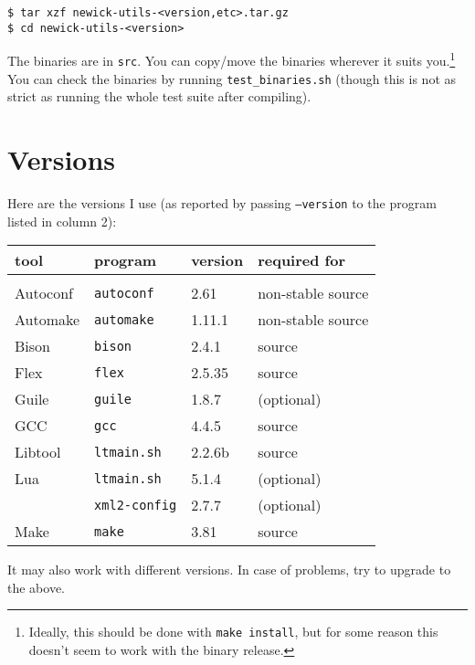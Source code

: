 \begin{verbatim}
$ tar xzf newick-utils-<version,etc>.tar.gz
$ cd newick-utils-<version>
\end{verbatim}

\noindent{}The binaries are in \texttt{src}. You can copy/move the binaries
wherever it suits you.\footnote{Ideally, this should be done with \texttt{make
install}, but for some reason this doesn't seem to work with the binary
release.} You can check the binaries by running \texttt{test\_binaries.sh}
(though this is not as strict as running the whole test suite after compiling).

\section{Versions}
\label{sct:versions}

\noindent{}Here are the versions I use (as reported by passing
\texttt{--version} to the program listed in column 2):

\begin{tabular}{llll}
\textbf{tool}	& \textbf{program} & \textbf{version} & \textbf{required for} \\
\hline \\
\gnu{} Autoconf	& \texttt{autoconf}	  	& 2.61 		& non-stable source \\
\gnu{} Automake	& \texttt{automake} 	 	& 1.11.1	& non-stable source \\
\gnu{} Bison 		& \texttt{bison}  			& 2.4.1 	& source \\ 
Flex						& \texttt{flex} 				& 2.5.35 	& source \\
\gnu{} Guile		& \texttt{guile}				& 1.8.7 	& (optional) \\
GCC 						& \texttt{gcc}  				& 4.4.5 	& source \\
\gnu{} Libtool	& \texttt{ltmain.sh}  	& 2.2.6b 	& source \\
\gnu{} Lua			& \texttt{ltmain.sh}  	& 5.1.4 	& (optional) \\
\libxml{}				& \texttt{xml2-config}	& 2.7.7 	& (optional) \\ 
\gnu{} Make			& \texttt{make}			 		& 3.81		& source \\
\end{tabular}

\medskip{}
\noindent{}It may also work with different versions. In case of problems, try to
upgrade to the above.
